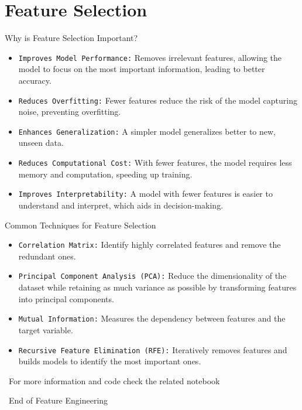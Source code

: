 \documentclass[serif, aspectratio=169]{beamer}
\begin{document}
\section{Feature Selection}

\begin{frame}{Why is Feature Selection Important?}
    \begin{itemize}
        \item \texttt{\color{teal}Improves Model Performance:} 
        Removes irrelevant features, allowing the model to focus on the most important information, leading to better accuracy.

        \item \texttt{\color{teal}Reduces Overfitting:} 
        Fewer features reduce the risk of the model capturing noise, preventing overfitting.

        \item \texttt{\color{teal}Enhances Generalization:} 
        A simpler model generalizes better to new, unseen data.

        \item \texttt{\color{teal}Reduces Computational Cost:} 
        With fewer features, the model requires less memory and computation, speeding up training.

        \item \texttt{\color{teal}Improves Interpretability:} 
        A model with fewer features is easier to understand and interpret, which aids in decision-making.
    \end{itemize}
\end{frame}

\begin{frame}{Common Techniques for Feature Selection}
    \begin{itemize}
        \item \texttt{\color{teal}Correlation Matrix:} 
        Identify highly correlated features and remove the redundant ones.

        \item \texttt{\color{teal}Principal Component Analysis (PCA):} 
        Reduce the dimensionality of the dataset while retaining as much variance as possible by transforming features into principal components.

        \item \texttt{\color{teal}Mutual Information:} 
        Measures the dependency between features and the target variable.

        \item \texttt{\color{teal}Recursive Feature Elimination (RFE):} 
        Iteratively removes features and builds models to identify the most important ones.
    \end{itemize}

\end{frame}


\begin{frame}
    \begin{center}
        {\Huge\ \color{red}For more information and code check the related notebook}
    \end{center}
\end{frame}


\begin{frame}
    \begin{center}
        {\Huge\ End of Feature Engineering}
    \end{center}
\end{frame}
\end{document}
